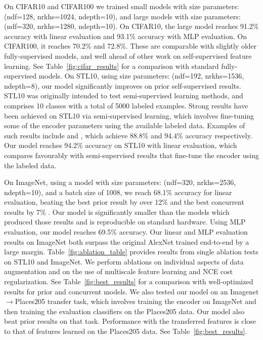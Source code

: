 \documentclass{article}
\begin{document}
On CIFAR10 and CIFAR100 we trained small models with size parameters: (ndf=128, nrkhs=1024, ndepth=10), and large models with size parameters: (ndf=320, nrkhs=1280, ndepth=10). On CIFAR10, the large model reaches 91.2\% accuracy with linear evaluation and 93.1\% accuracy with MLP evaluation. On CIFAR100, it reaches 70.2\% and 72.8\%. These are comparable with slightly older fully-supervised models, and well ahead of other work on self-supervised feature learning. See Table~\ref{fig:cifar_results} for a comparison with standard fully-supervised models.
On STL10, using size parameters: (ndf=192, nrkhs=1536, ndepth=8), our model significantly improves on prior self-supervised results.
STL10 was originally intended to test semi-supervised learning methods, and comprises 10 classes with a total of 5000 labeled examples.
Strong results have been achieved on STL10 via semi-supervised learning, which involves fine-tuning some of the encoder parameters using the available labeled data.
Examples of such results include \citep{Ji2019} and \citep{Berthelot2019}, which achieve 88.8\% and 94.4\% accuracy respectively. Our model reaches 94.2\% accuracy on STL10 with linear evaluation, which compares favourably with semi-supervised results that fine-tune the encoder using the labeled data.

On ImageNet, using a model with size parameters: (ndf=320, nrkhs=2536, ndepth=10), and a batch size of 1008, we reach 68.1\% accuracy for linear evaluation, beating the best prior result by over 12\% and the best concurrent results by 7\% \citep{Kolesnikov2019, Henaff2019, Tian2019}. Our model is significantly smaller than the models which produced those results and is reproducible on standard hardware.
Using MLP evaluation, our model reaches 69.5\% accuracy. Our linear and MLP evaluation results on ImageNet both surpass the original AlexNet trained end-to-end by a large margin.
Table~\ref{fig:ablation_table} provides results from single ablation tests on STL10 and ImageNet.
We perform ablations on individual aspects of data augmentation and on the use of multiscale feature learning and NCE cost regularization.
See Table~\ref{fig:best_results} for a comparison with well-optimized results for prior and concurrent models.
We also tested our model on an Imagenet$\rightarrow$Places205 transfer task, which involves training the encoder on ImageNet and then training the evaluation classifiers on the Places205 data.
Our model also beat prior results on that task. Performance with the transferred features is close to that of features learned on the Places205 data. See Table~\ref{fig:best_results}.
\end{document}
